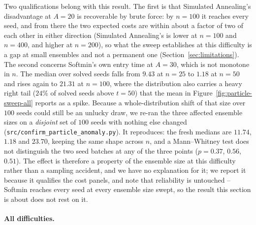 \documentclass{article} %
\theoremstyle{plain}
\theoremstyle{definition}
\theoremstyle{remark}
\begin{document}
Two qualifications belong with this result. The first is that Simulated Annealing's disadvantage at
$A=20$ is recoverable by brute force: by $n=100$ it reaches every seed, and from there the two expected
costs are within about a factor of two of each other in either direction (Simulated Annealing's is
lower at $n=100$ and $n=400$, and higher at $n=200$), so what the sweep establishes at this
difficulty is a gap at small ensembles and not a permanent one
(Section~\ref{sec:limitations}). The second concerns Softmin's own entry time at $A=30$, which is
not monotone in $n$. The median over solved seeds falls from $9.43$ at $n=25$ to $1.18$ at $n=50$
and rises again to $21.31$ at $n=100$, where the distribution also carries a heavy right tail
($24\%$ of solved seeds above $t=50$) that the mean in Figure~\ref{fig:particle-sweep-all} reports
as a spike. Because a whole-distribution shift of that size over $100$ seeds could still be an
unlucky draw, we re-ran the three affected ensemble sizes on a \emph{disjoint} set of $100$ seeds
with nothing else changed (\texttt{src/confirm\_particle\_anomaly.py}). It reproduces: the fresh
medians are $11.74$, $1.18$ and $23.70$, keeping the same shape across $n$, and a Mann--Whitney
test does not distinguish the two seed batches at any of the three points ($p=0.37$, $0.56$,
$0.51$). The effect is therefore a property of the ensemble size at this difficulty rather than a
sampling accident, and we have no explanation for it; we report it because it qualifies the cost
panels, and note that reliability is untouched -- Softmin reaches every seed at every ensemble size
swept, so the result this section is about does not rest on it.

\paragraph{All difficulties.}\label{apx:particle-sweep-all}
\end{document}

